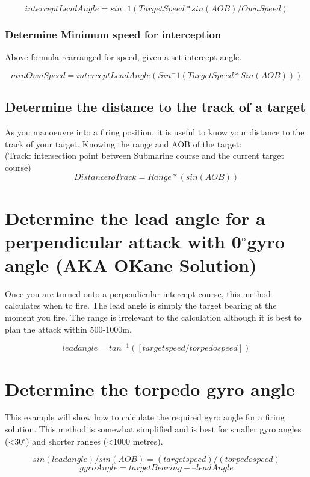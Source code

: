 \documentclass{article}
\newcommand{\degree}{$^{\circ}$}
\begin{document}
$$interceptLeadAngle= sin^-1 (TargetSpeed * sin(AOB) / OwnSpeed ) $$

\subsubsection{Determine Minimum speed for interception}
Above formula rearranged for speed, given a set intercept angle.

$$minOwnSpeed = interceptLeadAngle \left(Sin^-1(TargetSpeed * Sin(AOB))\right)$$


\subsection{Determine the distance to the track of a target}
As you manoeuvre into a firing position, it is useful to know your distance to the track of your target. Knowing the range and AOB of the target:\\(Track: intersection point between Submarine course and the current target course)
$$Distance to Track = Range * \left( sin(AOB) \right)$$


\section{Determine the lead angle for a perpendicular attack with 0\degree gyro angle (AKA O\' Kane Solution)}

Once you are turned onto a perpendicular intercept course, this method calculates when to fire. The lead angle is simply the target bearing at the moment you fire. The range is irrelevant to the calculation although it is best to plan the attack within 500-1000m.

$$ lead angle = tan^{-1} ( [target speed / torpedo speed] ) $$

\section{Determine the torpedo gyro angle}
This example will show how to calculate the required gyro angle for a firing solution. This method is somewhat simplified and is best for smaller gyro angles (\textless 30\degree) and shorter ranges (\textless 1000 metres).

$$sin (lead angle) / sin (AOB) = (target speed) / (torpedo speed)$$
$$ gyroAngle = targetBearing -– leadAngle $$
\end{document}
